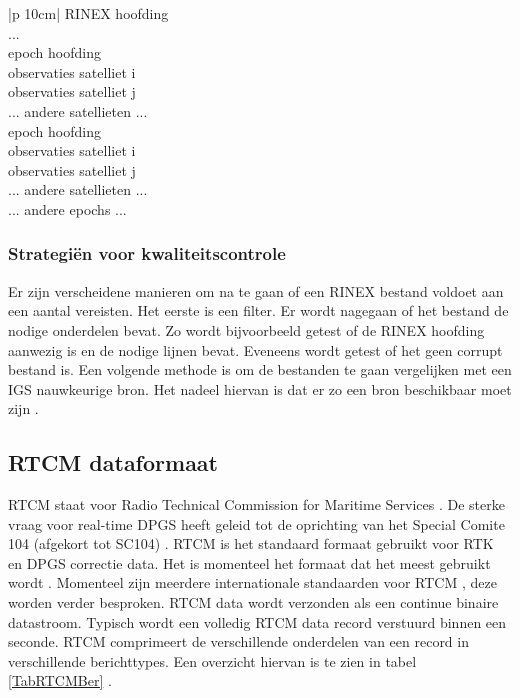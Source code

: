  \newcommand*{\MyIndent}{\hspace*{0.5cm}}%
 \begin{table}[hbp]
 	\caption{Vereenvoudigde samenstelling van een RINEX bestand}		
 	\begin{tabular}{|p {10cm}|}	
 		\hline
 		RINEX hoofding \\
 		... \\ \hline
 		epoch hoofding\\ \hline
 		\MyIndent observaties satelliet i \\ \hline
 		\MyIndent observaties satelliet j \\ \hline
 		... andere satellieten ... \\ \hline
 		epoch hoofding\\ \hline
 		\MyIndent observaties satelliet i \\ \hline
 		\MyIndent observaties satelliet j \\ \hline
 		... andere satellieten ... \\ \hline
 		... andere epochs ... \\ \hline	
 	\end{tabular}
 	\label{TabRINEX}
 \end{table}
 
 
\subsubsection{Strategi\"en voor kwaliteitscontrole}
Er zijn verscheidene manieren om na te gaan of een RINEX bestand voldoet aan een aantal vereisten. Het eerste is een filter. Er wordt nagegaan of het bestand de nodige onderdelen bevat. Zo wordt bijvoorbeeld getest of de RINEX hoofding aanwezig is en de nodige lijnen bevat. Eveneens wordt getest of het geen corrupt bestand is. Een volgende methode is om de bestanden te gaan vergelijken met een IGS nauwkeurige bron. Het nadeel hiervan is dat er zo een bron beschikbaar moet zijn \cite{LBibRINEX3}. 

\subsection{RTCM dataformaat}
\label{LRTC}
RTCM staat voor Radio Technical Commission for Maritime Services \cite{LBibGLONASS}. De sterke vraag voor real-time DPGS heeft geleid tot de oprichting van het Special Comite 104 (afgekort tot SC104) \cite{LBibRTCM}. RTCM is het standaard formaat gebruikt voor RTK en DPGS correctie data. Het is momenteel het formaat dat het meest gebruikt wordt \cite{LBibRTK3}. Momenteel zijn meerdere internationale standaarden voor RTCM \cite{LBibRTCM}, deze worden verder besproken. RTCM data wordt verzonden als een continue binaire datastroom. Typisch wordt een volledig RTCM data record verstuurd binnen een seconde. RTCM comprimeert de verschillende onderdelen van een record in verschillende berichttypes. Een overzicht hiervan is te zien in tabel \ref{TabRTCMBer} \cite{LBibRTCM3}.

